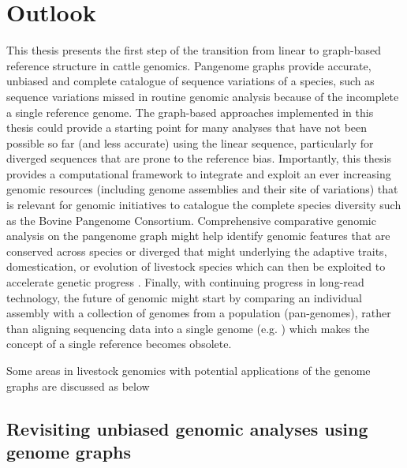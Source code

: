 \documentclass[../main.tex]{subfiles}
\begin{document}
\newpage

\section*{\LARGE{Outlook}}
{}
\thispagestyle{plain}
This thesis presents the first step of the transition from linear to graph-based reference structure in cattle genomics. Pangenome graphs provide accurate, unbiased and complete catalogue of sequence variations of a species, such as sequence variations missed in routine genomic analysis because of the incomplete a single reference genome. The graph-based approaches implemented in this thesis could provide a starting point for many analyses that have not been possible so far (and less accurate) using the linear sequence, particularly for diverged sequences that are prone to the reference bias. Importantly, this thesis provides a computational framework to integrate and exploit an ever increasing genomic resources (including genome assemblies and their site of variations) that is relevant for genomic initiatives to catalogue the complete species diversity such as the Bovine Pangenome Consortium. Comprehensive comparative genomic analysis on the pangenome graph might help identify genomic features that are conserved across species or diverged that might underlying the adaptive traits, domestication, or evolution of livestock species which can then be exploited to accelerate genetic progress \citep{foissac2019multi,clark2020faang}. Finally, with continuing progress in long-read technology, the future of genomic might start by comparing an individual assembly with a collection of genomes from  a population (pan-genomes), rather than aligning sequencing data into a single genome (e.g. \citep{ebert2021haplotype}) which makes the concept of a single reference becomes obsolete.

Some areas in livestock genomics with potential applications of the genome graphs are discussed as below


\subsection*{Revisiting unbiased genomic analyses using genome graphs}
\end{document}
